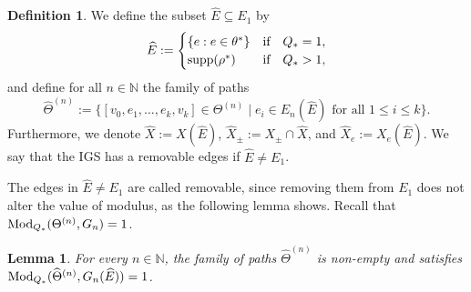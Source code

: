 \documentclass{amsart}
\newcommand{\Mod}{{\rm Mod}}
\newcommand{\supp}{{\rm supp}}
\newtheorem{lemma}[equation]{Lemma}
\numberwithin{equation}{section}
\theoremstyle{definition}
\newtheorem{definition}[equation]{Definition}
\theoremstyle{remark}
\newcommand{\N}{\mathbb{N}}
\begin{document}
\begin{definition}\label{def:removable}
    We define the subset \(\widehat{E}\subseteq E_1\) by    
        \[
            \widehat{E}:=\begin{cases}
                \{e : e\in \theta^*\}&\text{if}\quad Q_*=1,\\
                \supp(\rho^*)&\text{if}\quad Q_*>1,
            \end{cases}
        \]
    and define for all \(n\in\N\) the family of paths 
        \[
            \widehat{\Theta}^{(n)}:=\{[v_0,e_1,\ldots,e_k,v_k]\in \Theta^{(n)}\mid e_i\in E_n(\widehat{E}) \text{ for all }1\leq i\leq k\}.
        \]
    Furthermore, we denote \(\widehat{X}:=X(\widehat{E})\), \(\widehat{X}_\pm:=X_\pm\cap \widehat{X}\), and \(\widehat{X}_e:=X_e(\widehat{E})\). We say that the IGS has a removable edges if \(\widehat{E}\neq E_1\). 
\end{definition}
The edges in \(\widehat{E}\neq E_1\) are called removable, since removing them from $E_1$ does not alter the value of modulus, as the following lemma shows. Recall that $\Mod_{Q_*}(\Theta^{(n)}, G_n)=1$.


\begin{lemma}\label{Lemma: Critical exponent (porous)}
    For every \(n\in\N\), the family of paths \(\widehat{\Theta}^{(n)}\) is non-empty and satisfies \(\Mod_{Q_*}(\widehat{\Theta}^{(n)},G_n(\widehat{E}))=1\).
\end{lemma}
\end{document}
